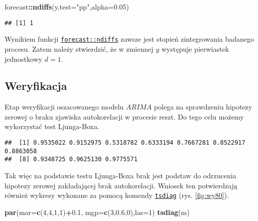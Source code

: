 \documentclass[polish,]{book}
\newenvironment{Shaded}{\begin{snugshade}}{\end{snugshade}}
\newcommand{\ControlFlowTok}[1]{\textcolor[rgb]{0.13,0.29,0.53}{\textbf{#1}}}
\newcommand{\DataTypeTok}[1]{\textcolor[rgb]{0.13,0.29,0.53}{#1}}
\newcommand{\DecValTok}[1]{\textcolor[rgb]{0.00,0.00,0.81}{#1}}
\newcommand{\FloatTok}[1]{\textcolor[rgb]{0.00,0.00,0.81}{#1}}
\newcommand{\KeywordTok}[1]{\textcolor[rgb]{0.13,0.29,0.53}{\textbf{#1}}}
\newcommand{\NormalTok}[1]{#1}
\newcommand{\OperatorTok}[1]{\textcolor[rgb]{0.81,0.36,0.00}{\textbf{#1}}}
\newcommand{\StringTok}[1]{\textcolor[rgb]{0.31,0.60,0.02}{#1}}
\begin{document}
\begin{Shaded}
\begin{Highlighting}[]
\NormalTok{forecast}\OperatorTok{::}\KeywordTok{ndiffs}\NormalTok{(y,}\DataTypeTok{test=}\StringTok{"pp"}\NormalTok{,}\DataTypeTok{alpha=}\FloatTok{0.05}\NormalTok{)}
\end{Highlighting}
\end{Shaded}

\begin{verbatim}
## [1] 1
\end{verbatim}

Wynikiem funkcji \href{https://rdrr.io/cran/forecast/man/ndiffs.html}{\texttt{forecast::ndiffs}} zawsze jest stopień zintegrowania badanego
procesu. Zatem należy stwierdzić, że w zmiennej \(y\) występuje pierwiastek jednostkowy \(d = 1\).

\hypertarget{part_732}{%
\subsection{Weryfikacja}\label{part_732}}

Etap weryfikacji oszacowanego modelu \(ARIMA\) polega na sprawdzeniu hipotezy zerowej o braku zjawiska autokorelacji w procesie reszt. Do tego celu możemy wykorzystać test Ljunga-Boxa.

\begin{Shaded}
\end{Shaded}

\begin{verbatim}
##  [1] 0.9535022 0.9152975 0.5318782 0.6333194 0.7667281 0.8522917 0.8863058
##  [8] 0.9348725 0.9625130 0.9775571
\end{verbatim}

Tak więc na podstawie testu Ljunga-Boxa brak jest podstaw do odrzucenia hipotezy
zerowej zakładającej brak autokorelacji. Wniosek ten potwierdzają również wykresy
wykonane za pomocą komendy \href{https://rdrr.io/r/stats/tsdiag.html}{\texttt{tsdiag}} (rys. \ref{fig:wy80}).

\begin{Shaded}
\begin{Highlighting}[]
\KeywordTok{par}\NormalTok{(}\DataTypeTok{mar=}\KeywordTok{c}\NormalTok{(}\DecValTok{4}\NormalTok{,}\DecValTok{4}\NormalTok{,}\DecValTok{1}\NormalTok{,}\DecValTok{1}\NormalTok{)}\OperatorTok{+}\FloatTok{0.1}\NormalTok{, }\DataTypeTok{mgp=}\KeywordTok{c}\NormalTok{(}\DecValTok{3}\NormalTok{,}\FloatTok{0.6}\NormalTok{,}\DecValTok{0}\NormalTok{),}\DataTypeTok{las=}\DecValTok{1}\NormalTok{)}
\KeywordTok{tsdiag}\NormalTok{(m)}
\end{Highlighting}
\end{Shaded}
\end{document}

